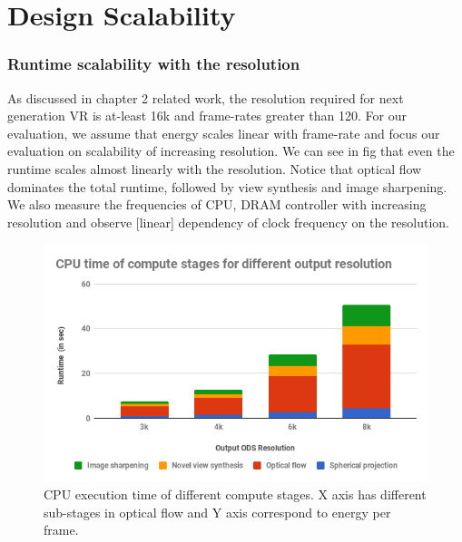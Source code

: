 \section{Design Scalability}	

\subsubsection{Runtime scalability with the resolution}
As discussed in chapter 2 related work, the resolution required for next generation VR is at-least 16k and frame-rates greater than 120. For our evaluation, we assume that energy scales linear with frame-rate and focus our evaluation on scalability of increasing resolution. We can see in fig that even the runtime scales almost linearly with the resolution. Notice that optical flow dominates the total runtime, followed by view synthesis and image sharpening. We also measure the frequencies of CPU, DRAM controller with increasing resolution and observe [linear] dependency of clock frequency on the resolution.
\begin{figure}[h]
	\begin{center}
		\includegraphics[width=1\textwidth]{data/images/ExecutionTimeComputeStages.png}
		\caption{CPU execution time of different compute stages. X axis has different sub-stages in optical flow and Y axis correspond to energy per frame.}
		\label{fig:ex_4_9}
	\end{center}
	\vspace{-0.3in}
\end{figure} 

